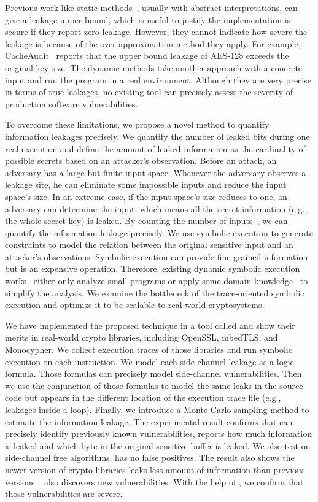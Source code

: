 Previous work like static methods~\cite{182946,5207642}, usually with
abstract interpretations, can give a leakage upper bound, which is useful to
justify the implementation is secure if they report zero leakage.
However, they cannot indicate how severe the leakage is because of the
over-approximation method they apply. For example, CacheAudit~\cite{182946} 
reports that the upper bound leakage of AES-128 exceeds the original key size. The dynamic methods take
another approach with a concrete input and run the program in a real
environment. Although they are very precise in terms of true leakages, no
existing tool can precisely assess the severity of production
software vulnerabilities. 

To overcome these limitations, we propose a novel method to quantify information 
leakages precisely. We quantify the number of leaked bits during one real 
execution and define the amount of leaked information as the cardinality of 
possible secrets based on an attacker's observation. Before an attack, an adversary has a large but finite input space. 
Whenever the adversary observes a leakage site, he can eliminate some impossible 
inputs and reduce the input space's size. In an extreme case, if the input space's size 
reduces to one, an adversary can determine the input, 
which means all the secret information (e.g., the whole secret key) is
leaked. By counting the number of inputs~\cite{10.1007/11499107_24}, 
we can quantify the information leakage precisely.
We use symbolic execution to generate constraints to model the relation 
between the original sensitive input and an attacker's observations. 
Symbolic execution can provide fine-grained information but is an expensive
operation. Therefore, existing dynamic symbolic
execution works~\cite{203878,236338,Brotzman19Casym} either only analyze
small programs or apply some domain knowledge~\cite{203878} to simplify the analysis. We
examine the bottleneck of the trace-oriented symbolic execution and optimize it
to be scalable to real-world cryptosystems.

We have implemented the proposed technique in a tool called \tool{} and show 
their merits in real-world crypto libraries, including OpenSSL, 
mbedTLS, and Monocypher.
We collect execution traces of those libraries and run 
symbolic execution on each instruction. We model
each side-channel leakage as a logic formula. Those
formulas can precisely model side-channel vulnerabilities. 
Then we use the conjunction of those formulas to model the 
same leaks in the source code but appears in the different location of
the execution trace file (e.g., leakages inside a loop).
Finally, we introduce a Monte Carlo sampling method to estimate 
the information leakage. 
The experimental result confirms
that \tool{} can precisely identify previously known vulnerabilities, 
reports how much information is leaked and which byte in the original sensitive 
buffer is leaked. We also test \tool{} on side-channel free algorithms. 
\tool{} has no false positives.
The result also shows the newer version of crypto libraries leaks less amount of information 
than previous versions.
\tool\ also discovers new vulnerabilities. With the help of \tool{}, 
we confirm that those vulnerabilities are severe.


